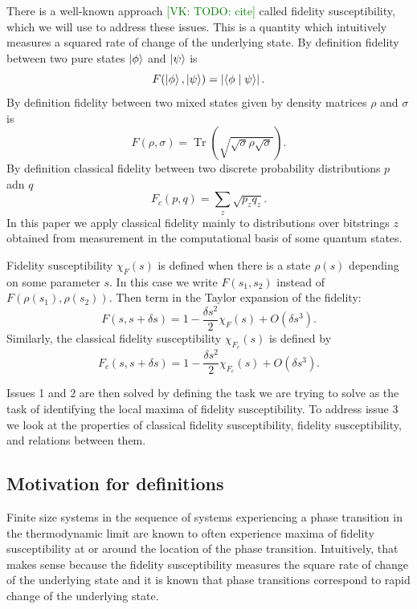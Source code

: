 \documentclass[american,aps,pra,reprint,floatfix,nofootinbib,superscriptaddress]{revtex4-2}
\DeclareMathOperator{\Tr}{Tr}
\newcommand{\abs}[1]{\left|#1\right|}
\newcommand{\VK}[1]{\textcolor{green}{[VK: #1]}}
\begin{document}
There is a well-known approach \VK{TODO: cite} called fidelity susceptibility,
which we will use to address these issues. This is a quantity which
intuitively measures a squared rate of change of the underlying state.
By definition fidelity between two pure states $\ket{\phi}$ and $\ket{\psi}$ is
\begin{equation}
\label{eq:def.F.pure}
  F(\ket{\phi}, \ket{\psi}) = \abs{\braket{\phi\mid \psi}}.
\end{equation}
By definition fidelity between two mixed states
given by density matrices $\rho$ and $\sigma$ is
\begin{equation}
\label{eq:def.F.mixed}
  F(\rho, \sigma) = \Tr\left(\sqrt{\sqrt{\sigma}\rho\sqrt{\sigma}}\right).
\end{equation}
By definition classical fidelity between two discrete probability distributions
$p$ adn $q$
\begin{equation}
\label{eq:def.Fc}
  F_c(p, q) = \sum_z \sqrt{p_z q_z}.
\end{equation}
In this paper we apply classical fidelity mainly to distributions over bitstrings
$z$ obtained from measurement in the computational basis of some quantum states.

Fidelity susceptibility $\chi_F(s)$ is defined when there is a state $\rho(s)$
depending on some parameter $s$. In this case we write $F(s_1, s_2)$ instead
of $F(\rho(s_1), \rho(s_2))$. Then
term in the Taylor expansion of the fidelity:
\begin{equation}
\label{eq:def.chiF}
  F(s, s + \delta s) = 1 - \frac{\delta s^2}{2} \chi_F(s) + O(\delta s^3).
\end{equation}
Similarly, the classical fidelity susceptibility $\chi_{F_c}(s)$ is defined by
\begin{equation}
\label{eq:def.chiFc}
  F_c(s, s + \delta s) = 1 - \frac{\delta s^2}{2} \chi_{F_c}(s) + O(\delta s^3).
\end{equation}

Issues 1 and 2 are then solved by defining the task we are trying to solve
as the task of identifying the local maxima of fidelity susceptibility.
To address issue 3 we look at the properties of classical fidelity
susceptibility, fidelity susceptibility, and relations between them.

\subsection{Motivation for definitions}
Finite size systems in the sequence of systems experiencing a phase transition
in the thermodynamic limit are known to often experience maxima of fidelity susceptibility at or around the location of the phase transition. Intuitively, that
makes sense because the fidelity susceptibility measures the square rate of change of the underlying state and it is known that phase transitions correspond to rapid change of the underlying state.
\end{document}
